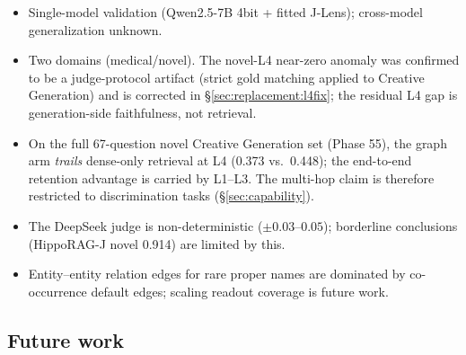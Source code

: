 \begin{itemize}
\item Single-model validation (Qwen2.5-7B 4bit + fitted J-Lens); cross-model
generalization unknown.
\item Two domains (medical/novel). The novel-L4 near-zero anomaly was
confirmed to be a judge-protocol artifact (strict gold matching applied to
Creative Generation) and is corrected in \S\ref{sec:replacement:l4fix}; the
residual L4 gap is generation-side faithfulness, not retrieval.
\item On the full 67-question novel Creative Generation set (Phase 55), the
graph arm \emph{trails} dense-only retrieval at L4 (0.373 vs.\ 0.448); the
end-to-end retention advantage is carried by L1--L3. The multi-hop claim is
therefore restricted to discrimination tasks (\S\ref{sec:capability}).
\item The DeepSeek judge is non-deterministic ($\pm 0.03$--$0.05$);
borderline conclusions (HippoRAG-J novel 0.914) are limited by this.
\item Entity--entity relation edges for rare proper names are dominated by
co-occurrence default edges; scaling readout coverage is future work.
\end{itemize}

\subsection{Future work}
\label{sec:discussion:future}


